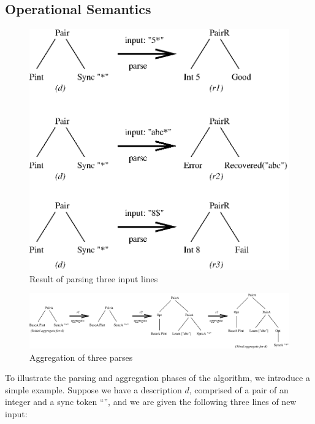\subsection{Operational Semantics}

\begin{figure}[t]
\begin{center}
\includegraphics[width=0.8\columnwidth]{parse}
\caption{Result of parsing three input lines}\label{fig:parse}
\end{center}
\end{figure}

\begin{figure}[t]
\begin{center}
\includegraphics[width=2\columnwidth]{aggregate}
\caption{Aggregation of three parses}\label{fig:aggregate}
\end{center}
\end{figure}

To illustrate the parsing and aggregation phases of the algorithm, we
introduce a simple example.
Suppose we have a description $d$, comprised of a pair of an integer and a sync token ``\cd{*}'',
and we are given the following three lines of new input:

